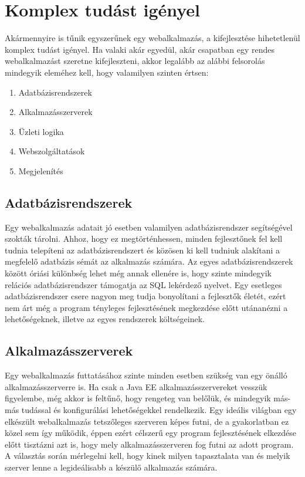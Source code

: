 \documentclass[hidelinks, 12pt, a4paper]{report}
\begin{document}
\section{Komplex tudást igényel}

Akármennyire is tűnik egyszerűnek egy webalkalmazás, a kifejlesztése hihetetlenül komplex tudást igényel. Ha valaki akár egyedül, akár csapatban egy rendes webalkalmazást szeretne kifejleszteni, akkor legalább az alábbi felsorolás mindegyik eleméhez kell, hogy valamilyen szinten értsen:
\begin{enumerate}
\item Adatbázisrendszerek
\item Alkalmazásszerverek
\item Üzleti logika
\item Webszolgáltatások
\item Megjelenítés
\end{enumerate}

\subsection{Adatbázisrendszerek}

Egy webalkalmazás adatait jó esetben valamilyen adatbázisrendszer segítségével szokták tárolni. Ahhoz, hogy ez megtörténhessen, minden fejlesztőnek fel kell tudnia telepíteni az adatbázisrendszert és közösen ki kell tudniuk alakítani a megfelelő adatbázis sémát az alkalmazás számára. Az egyes adatbázisrendszerek között óriási különbség lehet még annak ellenére is, hogy szinte mindegyik relációs adatbázisrendszer támogatja az SQL lekérdező nyelvet. Egy esetleges adatbázisrendszer csere nagyon meg tudja bonyolítani a fejlesztők életét, ezért nem árt még a program tényleges fejlesztésének megkezdése előtt utánanézni a lehetőségeknek, illetve az egyes rendszerek költségeinek.


\subsection{Alkalmazásszerverek}

Egy webalkalmazás futtatásához szinte minden esetben szükség van egy önálló alkalmazásszerverre is. Ha csak a Java EE alkalmazásszervereket vesszük figyelembe, még akkor is feltűnő, hogy rengeteg van belőlük, és mindegyik más-más tudással és konfigurálási lehetőségekkel rendelkezik. Egy ideális világban egy elkészült webalkalmazás tetszőleges szerveren képes futni, de a gyakorlatban ez közel sem így működik, éppen ezért célszerű egy program fejlesztésének elkezdése előtt tisztázni azt is, hogy mely alkalmazásszerveren fog futni az adott program. A választás során mérlegelni kell, hogy kinek milyen tapasztalata van és melyik szerver lenne a legideálisabb a készülő alkalmazás számára.
\end{document}

